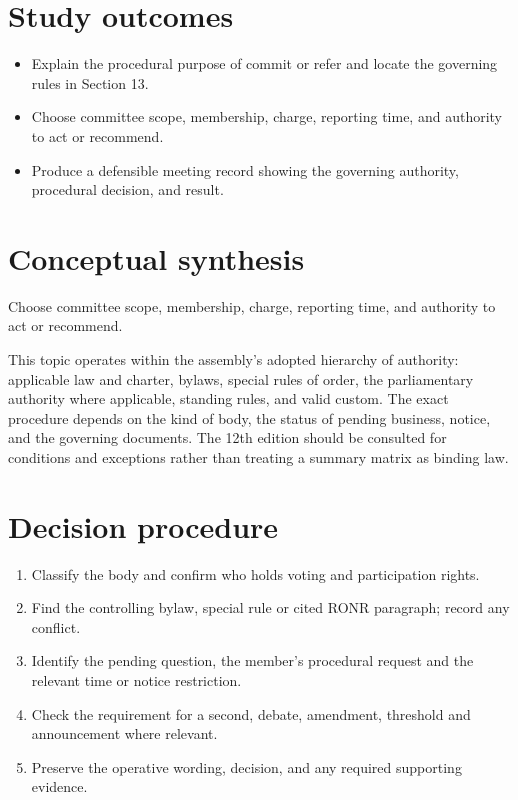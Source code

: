 \documentclass[11pt]{article}
\begin{document}
\SuiteOpen
{}
\section{Study outcomes}
\begin{itemize}[leftmargin=*,itemsep=4pt]
\item Explain the procedural purpose of commit or refer and locate the governing rules in Section 13.
\item Choose committee scope, membership, charge, reporting time, and authority to act or recommend.
\item Produce a defensible meeting record showing the governing authority, procedural decision, and result.
\end{itemize}

\section{Conceptual synthesis}
Choose committee scope, membership, charge, reporting time, and authority to act or recommend.

This topic operates within the assembly’s adopted hierarchy of authority: applicable law and charter, bylaws, special rules of order, the parliamentary authority where applicable, standing rules, and valid custom. The exact procedure depends on the kind of body, the status of pending business, notice, and the governing documents. The 12th edition should be consulted for conditions and exceptions rather than treating a summary matrix as binding law.
\section{Decision procedure}
\begin{enumerate}[leftmargin=*,itemsep=4pt]
\item Classify the body and confirm who holds voting and participation rights.
\item Find the controlling bylaw, special rule or cited RONR paragraph; record any conflict.
\item Identify the pending question, the member’s procedural request and the relevant time or notice restriction.
\item Check the requirement for a second, debate, amendment, threshold and announcement where relevant.
\item Preserve the operative wording, decision, and any required supporting evidence.
\end{enumerate}
\end{document}
